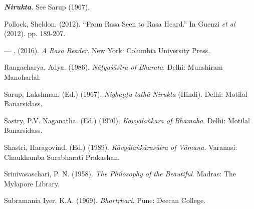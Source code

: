 \begin{thebibliography}{99}
  \textit{\textbf{Nirukta}}. See Sarup (1967).

  Pollock, Sheldon. (2012). “From Rasa Seen to Rasa Heard.” In Guenzi \textit{et al} (2012). pp. 189-207.

  — . (2016). \textit{A Rasa Reader}. New York: Columbia University Press.

  Rangacharya, Adya. (1986). \textit{Nāṭyaśāstra of Bharata}. Delhi: Munshiram Manoharlal.

  Sarup, Lakshman. (Ed.) (1967). \textit{Nighaṇṭu tathā Nirukta} (Hindi). Delhi: Motilal Banarsidass.

  Sastry, P.V. Naganatha. (Ed.) (1970).\textit{ Kāvyālaṅkāra of Bhāmaha}. Delhi: Motilal Banarsidass.

  Shastri, Haragovind. (Ed.) (1989). \textit{Kāvyālaṅkārasūtra of Vāmana.} Varanasi: Chaukhamba Surabharati Prakashan.

  Srinivasaschari, P. N. (1958). \textit{The Philosophy of the Beautiful}. Madras: The Mylapore Library.

  Subramania Iyer, K.A. (1969). \textit{Bhartṛhari}. Pune: Deccan College.

 \end{thebibliography}

